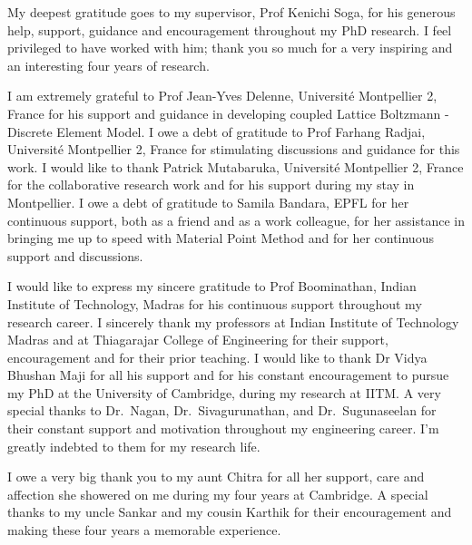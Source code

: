 
\begin{acknowledgements}      

My deepest gratitude goes to my supervisor, Prof Kenichi Soga, for his 
generous help, support, guidance and encouragement throughout my PhD research. 
I feel privileged to have worked with him; thank you so much for a very 
inspiring and an interesting four years of research. 

I am extremely grateful to Prof Jean-Yves Delenne, Universit\'{e} Montpellier 
2, France for his support and guidance in developing coupled Lattice Boltzmann 
- Discrete Element Model. I owe a debt of gratitude to Prof Farhang Radjai, 
Universit\'{e} Montpellier 2, France for stimulating discussions and guidance 
for this work. I would like to thank Patrick Mutabaruka, Universit\'{e} 
Montpellier 2, France for the collaborative research work and for his support 
during my stay in Montpellier. I owe a debt of gratitude to Samila Bandara, 
EPFL for her continuous support, both as a friend and as a work colleague, for 
her assistance in bringing me up to speed with Material Point Method and for 
her continuous support and discussions.

I would like to express my sincere gratitude to Prof Boominathan, Indian 
Institute of Technology, Madras for his continuous support throughout my 
research career. I sincerely thank my professors at Indian Institute of 
Technology Madras and at Thiagarajar College of Engineering for their support, 
encouragement and for their prior teaching. I would like to thank Dr Vidya 
Bhushan Maji for all his support and for his constant encouragement to pursue 
my PhD at the University of Cambridge, during my research at IITM. A very 
special thanks to Dr.~Nagan, Dr.~Sivagurunathan, and Dr.~Sugunaseelan for their 
constant support and motivation throughout my engineering career. I'm greatly 
indebted to them for my research life.

I owe a very big thank you to my aunt Chitra for all her support, care and 
affection she showered on me during my four years at Cambridge. A special 
thanks to my uncle Sankar and my cousin Karthik for their encouragement and 
making these four years a memorable experience.


\end{acknowledgements}
